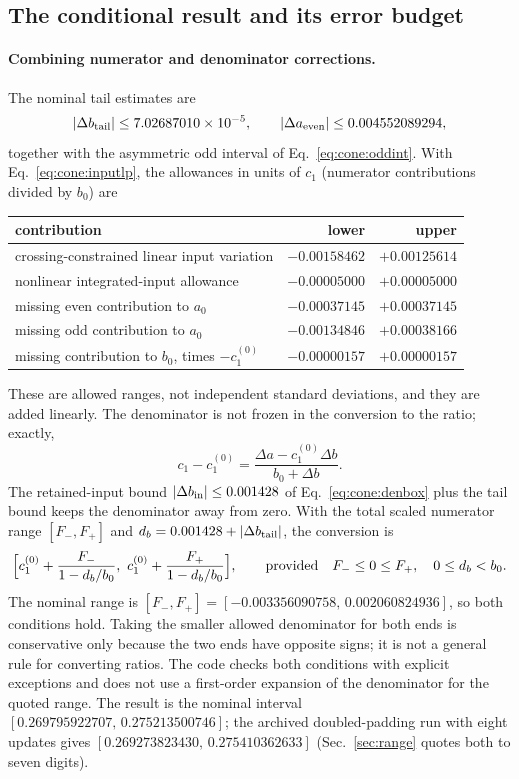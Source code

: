 \documentclass[11pt,a4paper]{article}
\numberwithin{equation}{section}
\newcommand{\sci}[2]{#1\times10^{#2}}
\begin{document}
\subsection{The conditional result and its error budget}\label{app:cone:budget}
\paragraph{Combining numerator and denominator corrections.} The nominal tail estimates are
\begin{equation}
 |\Delta b_{\rm tail}|\le\sci{7.02687010}{-5},\qquad |\Delta a_{\rm even}|\le0.004552089294,
\end{equation}
together with the asymmetric odd interval of Eq.~\eqref{eq:cone:oddint}. With Eq.~\eqref{eq:cone:inputlp}, the
allowances in units of $c_1$ (numerator contributions divided by $b_0$) are
\begin{center}\small
\begin{tabular}{@{}lrr@{}}
\toprule
contribution & lower & upper\\
\midrule
crossing-constrained linear input variation & $-0.00158462$ & $+0.00125614$\\
nonlinear integrated-input allowance & $-0.00005000$ & $+0.00005000$\\
missing even contribution to $a_0$ & $-0.00037145$ & $+0.00037145$\\
missing odd contribution to $a_0$ & $-0.00134846$ & $+0.00038166$\\
missing contribution to $b_0$, times $-c_1^{(0)}$ & $-0.00000157$ & $+0.00000157$\\
\bottomrule
\end{tabular}
\end{center}
These are allowed ranges, not independent standard deviations, and they are added linearly. The denominator is not
frozen in the conversion to the ratio; exactly,
\begin{equation}
 c_1-c_1^{(0)}=\frac{\Delta a-c_1^{(0)}\Delta b}{b_0+\Delta b}.
 \label{eq:cone:exactratio}
\end{equation}
The retained-input bound $|\Delta b_{\rm in}|\le0.001428$ of Eq.~\eqref{eq:cone:denbox} plus the tail bound keeps the
denominator away from zero. With the total scaled numerator range $[F_-,F_+]$ and $d_b=0.001428+|\Delta b_{\rm tail}|$,
the conversion is
\begin{equation}
 \Bigl[c_1^{(0)}+\frac{F_-}{1-d_b/b_0},\ c_1^{(0)}+\frac{F_+}{1-d_b/b_0}\Bigr],\qquad\text{provided}\quad
 F_-\le0\le F_+,\quad 0\le d_b<b_0 .
 \label{eq:cone:ratioguard}
\end{equation}
The nominal range is $[F_-,F_+]=[-0.003356090758,\,0.002060824936]$, so both conditions hold. Taking the smaller
allowed denominator for both ends is conservative only because the two ends have opposite signs; it is not a general
rule for converting ratios. The code checks both conditions with explicit exceptions and does not use a first-order
expansion of the denominator for the quoted range. The result is the nominal interval
$[0.269795922707,\,0.275213500746]$; the archived doubled-padding run with eight updates gives
$[0.269273823430,\,0.275410362633]$ (Sec.~\ref{sec:range} quotes both to seven digits).
\end{document}
